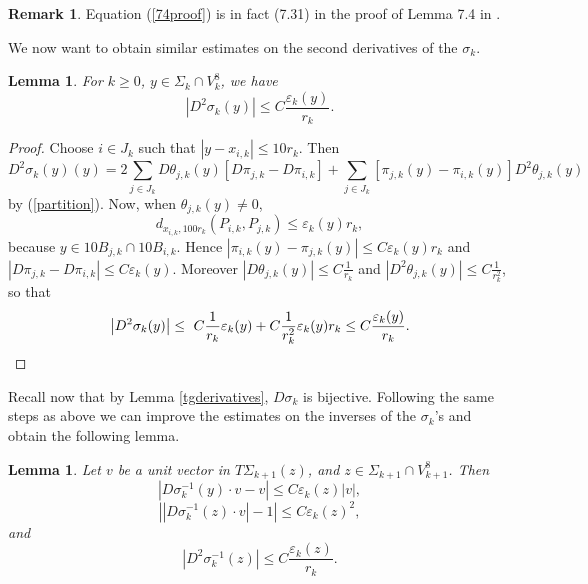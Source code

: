 \documentclass[11pt, twoside, leqno]{article}
\numberwithin{equation}{section}
\theoremstyle{plain}
\newtheorem{lem}[thm]{Lemma}
\theoremstyle{definition}
\newtheorem{rk}[thm]{Remark}
\newcommand{\e}{\varepsilon} %
\begin{document}
\begin{rk}
Equation (\ref{74proof}) is in fact (7.31) in the proof of Lemma 7.4 in \cite{davidtoro}.
\end{rk}
We now want to obtain similar estimates on the second derivatives of the $\sigma_k$.
\begin{lem} \label{lem1}
For $k \geq 0$, $y \in \Sigma_k \cap V_k^8$,  we have
\begin{equation}
\left|D^2 \sigma_k(y)\right| \leq C \frac{\e_k(y)}{r_k}.
\end{equation}
\end{lem}


\begin{proof}
Choose $i \in J_k$ such that $|y-x_{i,k}| \leq 10r_k$. Then
\begin{equation} 
D^2 \sigma_k(y)(y) =  2\sum_{j \in J_k} D\theta_{j,k}(y)\left[D\pi_{j,k}- D\pi_{i,k}\right] + \sum_{j \in J_k} [\pi_{j,k}(y)-\pi_{i,k}(y)]D^2\theta_{j,k}(y)
\end{equation} 
by (\ref{partition}). Now, when $\theta_{j,k}(y)\neq 0$,
\begin{equation}
d_{x_{i,k},100r_k}(P_{i,k},P_{j,k}) \leq \e_k(y)r_k,
\end{equation}
because $ y \in 10B_{j,k}\cap 10B_{i,k}$. Hence $|\pi_{i,k}(y)-\pi_{j,k}(y)| \leq C \e_k(y)r_k$
and $\left|D\pi_{j,k}- D\pi_{i,k}\right| \leq C \e_k(y)$. Moreover $\left|D\theta_{j,k}(y)\right| \leq C\frac{1}{r_k}$ and $\left| D^2\theta_{j,k}(y)\right| \leq C\frac{1}{r_k^2}$, so that
\begin{equation}
\left| D^2 \sigma_k(y) \right| \leq  \ C\frac{1}{r_k}  \e_k(y) + C\frac{1}{r_k^2} \e_k(y)r_k \leq C \frac{\e_k(y)}{r_k}. \qedhere
\end{equation}
\end{proof} 



Recall now that by Lemma \ref{tgderivatives}, $D\sigma_k$ is bijective.  Following the same steps as above we can improve the estimates on the inverses of the $\sigma_k$'s and obtain the following lemma.

\begin{lem}
Let $v$ be a unit vector in $T\Sigma_{k+1}(z)$, and $z \in \Sigma_{k+1}\cap V_{k+1}^8$. Then 
\begin{equation} \label{zeroinverse}
\left| D\sigma^{-1}_k(y)\cdot v - v \right| \leq  C \e_k(z)|v|,
\end{equation}
\begin{equation} \label{oneinverse}
\left||D\sigma_k^{-1}(z)\cdot v|-1\right| \leq  C \e_k(z)^2,
\end{equation}
and
\begin{equation} \label{twoinverse}
\left| D^2\sigma_k^{-1}(z)\right| \leq C  \frac{\e_k(z)}{r_k}.
\end{equation}
\end{lem}
\end{document}
